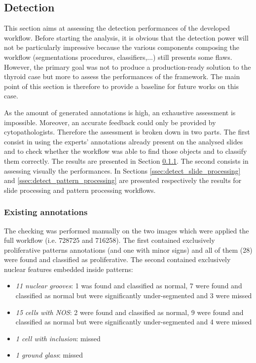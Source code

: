\subsection{Detection}

This section aims at assessing the detection performances of the developed workflow. Before starting the analysis, it is obvious that the detection power will not be particularly impressive because the various components composing the workflow (segmentations procedures, classifiers,...) still presents some flaws. However, the primary goal was not to produce a production-ready solution to the thyroid case but more to assess the performances of the framework. The main point of this section is therefore to provide a baseline for future works on this case. 

As the amount of generated annotations is high, an exhaustive assessment is impossible. Moreover, an accurate feedback could only be provided by cytopathologists. Therefore the assessment is broken down in two parts. The first consist in using the experts' annotations already present on the analysed slides and to check whether the workflow was able to find those objects and to classify them correctly. The results are presented in Section \ref{fig:existing_annotations}. The second consists in assessing visually the performances. In Sections \ref{ssec:detect_slide_processing} and \ref{ssec:detect_pattern_processing} are presented respectively the results for slide processing and pattern processing workflows. 

\subsubsection{Existing annotations}
\label{fig:existing_annotations}
The checking was performed manually on the two images which were applied the full workflow (i.e. 728725 and 716258). The first contained exclusively proliferative patterns annotations (and one with minor signs) and all of them (28) were found and classified as proliferative. The second contained exclusively nuclear features embedded inside patterns:

\begin{itemize}
	\item \textit{11 nuclear grooves}: 1 was found and classified as normal, 7 were found and classified as normal but were significantly under-segmented and 3 were missed
	\item \textit{15 cells with NOS}: 2 were found and classified as normal, 9 were found and classified as normal but were significantly under-segmented and 4 were missed
	\item \textit{1 cell with inclusion}: missed
	\item \textit{1 ground glass}: missed
\end{itemize}


